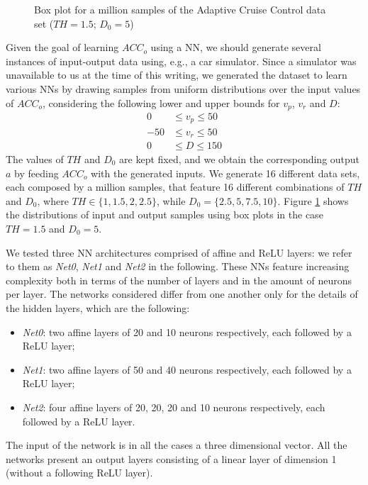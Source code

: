 \begin{figure}[t]
	\caption{Box plot for a million samples of the Adaptive Cruise Control 
		data set ($TH = 1.5$; $D_0 = 5$)}
	\label{fig:cruise-boxplot}
	\centering
\end{figure}

Given the goal of learning $ACC_{o}$ using a NN, we should generate
several instances of input-output data using, e.g., a car
simulator. Since a simulator was unavailable to us at the time of this 
writing, we generated the dataset to learn various NNs by drawing
samples from uniform distributions over the input values of $ACC_{o}$,
considering the following lower and upper bounds for $v_p$, $v_r$ and $D$:
%
\begin{equation}
	\begin{aligned}
		0 & \leq v_p \leq 50 \\
		-50 & \leq v_r \leq 50 \\
		0 & \leq D \leq 150
	\end{aligned}
	\label{eq:outbounds-in}
\end{equation}
%
The values of $TH$ and $D_0$ are kept fixed, and we obtain the
corresponding output $a$ by feeding $ACC_{o}$ with the generated inputs. 
We generate 16 different data sets, each composed by a million
samples, that feature 16 different combinations of $TH$ and $D_0$,
where $TH \in \{1, 1.5, 2, 2.5\}$, while $D_0 = \{2.5, 5, 7.5, 10\}$. 
Figure \ref{fig:cruise-boxplot} shows the distributions of input and
output samples using box plots in the case $TH=1.5$ and $D_0 = 5$.

We tested three NN architectures comprised of affine and ReLU
layers: we refer to them as \textit{Net0}, \textit{Net1} and
\textit{Net2} in the following. These NNs feature increasing complexity 
both in terms of the number of layers and in the amount of neurons per 
layer. The networks considered differ from one another only for the details 
of the hidden layers, which are the following:
%
\begin{itemize}
	\item \textit{Net0}: two affine layers of 20 and 10 neurons respectively, 
	each followed by a ReLU layer;
	\item \textit{Net1}: two affine layers of 50 and 40 neurons respectively, 
	each followed by a ReLU layer;
	\item \textit{Net2}: four affine layers of 20, 20, 20 and 10 neurons 
	respectively, each followed by a ReLU layer.
\end{itemize}
%
The input of the network is in all the cases a three dimensional vector.
All the networks present an output layers consisting
of a linear layer of dimension 1 (without a following ReLU layer).

